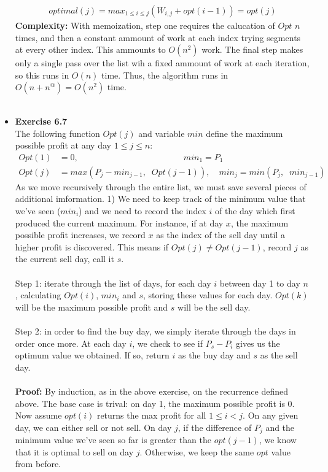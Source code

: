 \documentclass[a4paper]{article}
\begin{document}
\begin{itemize}
\begin{align*}
optimal(j) = max_{1 \leq i \leq j} (W_{i,j} + opt(i-1)) = opt(j)
\end{align*}
\textbf{Complexity:}
With memoization, step one requires the calucation of $Opt$ $n$ times, and then a constant ammount of work at each index trying segments at every other index. This ammounts to $O(n^2)$ work. The final step makes only a single pass over the list wih a fixed ammount of work at each iteration, so this runs in $O(n)$ time. Thus, the algorithm runs in $O(n+n^@) = O(n^2)$ time. \\
\\


\item{\textbf{Exercise 6.7}} \\
The following function $Opt(j)$ and variable $min$ define the maximum possible profit at any day $1 \leq j \leq n$:
\begin{align*}
Opt(1) &= 0, \;\;\hspace{140pt}min_1 = P_1 \\
Opt(j) &= max(P_j - min_{j-1},\;\; Opt(j-1)), \hspace{12pt}min_{j} = min(P_j,\;\; min_{j-1})
\end{align*}
As we move recursively through the entire list, we must save several pieces of additional imformation. 1) We need to keep track of the minimum value that we've seen ($min_i$) and we need to record the index $i$ of the day which first produced the current maximum. For instance, if at day $x$, the maximum possible profit increases, we record $x$ as the index of the sell day until a higher profit is discovered. This means if $Opt(j) \neq Opt(j-1)$, record $j$ as the current sell day, call it $s$. \\
\\
Step 1: iterate through the list of days, for each day $i$ between day 1 to day $n$, calculating $Opt(i)$, $min_i$ and $s$, storing these values for each day. $Opt(k)$ will be the maximum possible profit and $s$ will be the sell day. \\
\\
Step 2: in order to find the buy day, we simply iterate through the days in order once more. At each day $i$, we check to see if $P_s - P_i$ gives us the optimum value we obtained. If so, return $i$ as the buy day and $s$ as the sell day. \\
\\
\textbf{Proof:} By induction, as in the above exercise, on the recurrence defined above. The base case is trival: on day 1, the maximum possible profit is 0. Now assume $opt(i)$ returns the max profit for all $1 \leq i < j$. On any given day, we can either sell or not sell. On day $j$, if the difference of $P_j$ and the minimum value we've seen so far is greater than the $opt(j-1)$, we know that it is optimal to sell on day $j$. Otherwise, we keep the same $opt$ value from before.\\

\end{itemize}
\end{document}
